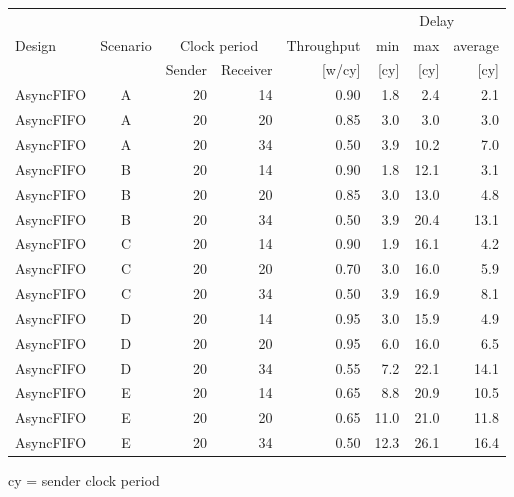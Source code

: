 % 
% 
\begin{tabular}{lc|*{6}{r}}
  & & & & & \multicolumn{3}{c}{Delay}\\
 Design & Scenario & \multicolumn{2}{c}{Clock period} & Throughput &  min & max & average \\
  & & Sender & Receiver & [w/cy] & [cy] & [cy] & [cy] \\
\hline
 AsyncFIFO & A &  20 & 14 & 0.90  & 1.8 & 2.4 & 2.1 \\[0ex]
 AsyncFIFO & A &  20 & 20 & 0.85  & 3.0 & 3.0 & 3.0 \\[0ex]
 AsyncFIFO & A &  20 & 34 & 0.50  & 3.9 & 10.2 & 7.0 \\[0ex]
 AsyncFIFO & B &  20 & 14 & 0.90  & 1.8 & 12.1 & 3.1 \\[0ex]
 AsyncFIFO & B &  20 & 20 & 0.85  & 3.0 & 13.0 & 4.8 \\[0ex]
 AsyncFIFO & B &  20 & 34 & 0.50  & 3.9 & 20.4 & 13.1 \\[0ex]
 AsyncFIFO & C &  20 & 14 & 0.90  & 1.9 & 16.1 & 4.2 \\[0ex]
 AsyncFIFO & C &  20 & 20 & 0.70  & 3.0 & 16.0 & 5.9 \\[0ex]
 AsyncFIFO & C &  20 & 34 & 0.50  & 3.9 & 16.9 & 8.1 \\[0ex]
 AsyncFIFO & D &  20 & 14 & 0.95  & 3.0 & 15.9 & 4.9 \\[0ex]
 AsyncFIFO & D &  20 & 20 & 0.95  & 6.0 & 16.0 & 6.5 \\[0ex]
 AsyncFIFO & D &  20 & 34 & 0.55  & 7.2 & 22.1 & 14.1 \\[0ex]
 AsyncFIFO & E &  20 & 14 & 0.65  & 8.8 & 20.9 & 10.5 \\[0ex]
 AsyncFIFO & E &  20 & 20 & 0.65  & 11.0 & 21.0 & 11.8 \\[0ex]
 AsyncFIFO & E &  20 & 34 & 0.50  & 12.3 & 26.1 & 16.4 \\[0ex]
\hline
\end{tabular}
 
cy = sender clock period
 
